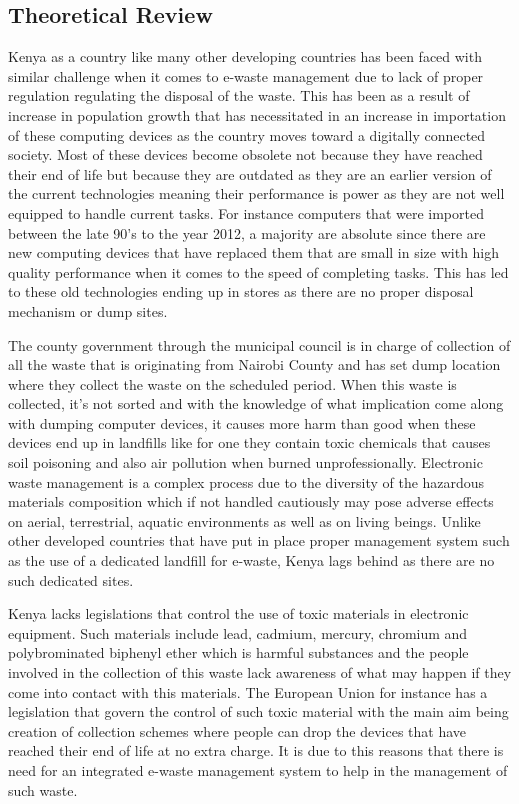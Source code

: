 \documentclass{article}
\begin{document}
\subsection{Theoretical Review}
Kenya as a country like many other developing countries has been faced with similar challenge when it comes to e-waste management due to lack of proper regulation regulating the disposal of the waste. This has been as a result of increase in population growth that has necessitated in an increase in importation of these computing devices as the country moves toward a digitally connected society. Most of these devices become obsolete not because they have reached their end of life but because they are outdated as they are an earlier version of the current technologies meaning their performance is power as they are not well equipped to handle current tasks. For instance computers that were imported between the late 90’s to the year 2012, a majority are absolute since there are new computing devices that have replaced them that are small in size with high quality performance when it comes to the speed of completing tasks. This has led to these old technologies ending up in stores as there are no proper disposal mechanism or dump sites. 

The county government through the municipal council is in charge of collection of all the waste that is originating from Nairobi County and has set dump location where they collect the waste on the scheduled period. When this waste is collected, it’s not sorted and with the knowledge of what implication come along with dumping computer devices, it causes more harm than good when these devices end up in landfills like for one they contain toxic chemicals that causes soil poisoning and also air pollution when burned unprofessionally. Electronic waste management is a complex process due to the diversity of the hazardous materials composition which if not handled cautiously may pose adverse effects on aerial, terrestrial, aquatic environments as well as on living beings\cite{robinson2009waste}. Unlike other developed countries that have put in place proper management system such as the use of a dedicated landfill for e-waste, Kenya lags behind as there are no such dedicated sites.

Kenya lacks legislations that control the use of toxic materials in electronic equipment. Such materials include lead, cadmium, mercury, chromium and polybrominated biphenyl ether which is harmful substances and the people involved in the collection of this waste lack awareness of what may happen if they come into contact with this materials. The European Union for instance has a legislation that govern the control of such toxic material with the main aim being creation of collection schemes where people can drop the devices that have reached their end of life at no extra charge\cite{stenvall2013analysis}. It is due to this reasons that there is need for an integrated e-waste management system to help in the management of such waste.
\end{document}
